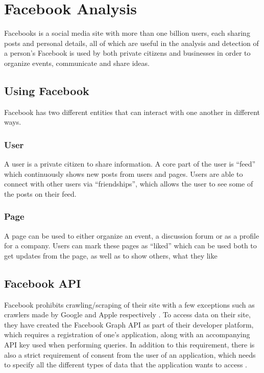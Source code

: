 \section{Facebook Analysis}\label{sec:facebook-analysis}
Facebooks is a social media site with more than one billion users, each
sharing posts and personal details, all of which are useful in the analysis and
detection of a person's \fbp Facebook is used by both private citizens and
businesses in order to organize events, communicate and share ideas. 

\subsection{Using Facebook}
Facebook has two different entities that can interact with one another in
different ways.

\subsubsection{User}
A user is a private citizen to share information. A core part of the user is
``feed'' which continuously shows new posts from users and pages. Users are able
to connect with other users via ``friendships'', which allows the user to see
some of the posts on their feed.

\subsubsection{Page}
A page can be used to either organize an event, a discussion forum or as a
profile for a company. Users can mark these pages as ``liked'' which can be
used both to get updates from the page, as well as to show others, what they
like

\subsection{Facebook API}
Facebook prohibits crawling/scraping of their site with a few exceptions such as
crawlers made by Google and Apple respectively
\citep{FacebookRobotsTxt}.
To access data on their site, they have created the Facebook Graph \ac{API} as
part of their developer platform, which requires a registration of one's
application, along with an accompanying \ac{API} key used when performing
queries.
In addition to this requirement, there is also a strict requirement of consent
from the user of an application, which needs to specify all the different types
of data that the application wants to access \citep{FacebookGraphApiAccessTokens}.\nl

